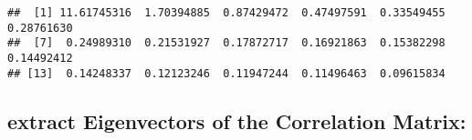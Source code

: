 \documentclass[
]{article}
\newenvironment{Shaded}{\begin{snugshade}}{\end{snugshade}}
\newcommand{\AttributeTok}[1]{\textcolor[rgb]{0.13,0.29,0.53}{#1}}
\newcommand{\CommentTok}[1]{\textcolor[rgb]{0.56,0.35,0.01}{\textit{#1}}}
\newcommand{\FunctionTok}[1]{\textcolor[rgb]{0.13,0.29,0.53}{\textbf{#1}}}
\newcommand{\NormalTok}[1]{#1}
\newcommand{\OtherTok}[1]{\textcolor[rgb]{0.56,0.35,0.01}{#1}}
\newcommand{\SpecialCharTok}[1]{\textcolor[rgb]{0.81,0.36,0.00}{\textbf{#1}}}
\newcommand{\StringTok}[1]{\textcolor[rgb]{0.31,0.60,0.02}{#1}}
\begin{document}
\begin{verbatim}
##  [1] 11.61745316  1.70394885  0.87429472  0.47497591  0.33549455  0.28761630
##  [7]  0.24989310  0.21531927  0.17872717  0.16921863  0.15382298  0.14492412
## [13]  0.14248337  0.12123246  0.11947244  0.11496463  0.09615834
\end{verbatim}

\hypertarget{extract-eigenvectors-of-the-correlation-matrix}{%
\subsection{extract Eigenvectors of the Correlation
Matrix:}\label{extract-eigenvectors-of-the-correlation-matrix}}

\begin{Shaded}
\end{Shaded}
\end{document}
